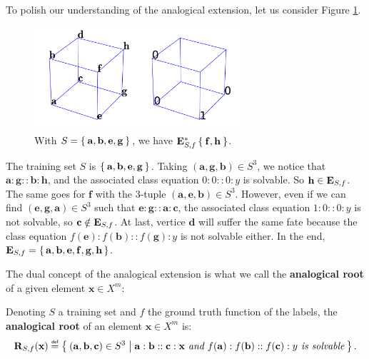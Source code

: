 To polish our understanding of the analogical extension, let us consider Figure
\ref{FIG:ae_example}.
\begin{figure}[!h]
\centering
  \includegraphics[width=3in]{figures/ae_example.pdf}
  \caption{With $S = \Set{\mathbf{a}, \mathbf{b}, \mathbf{e},
  \mathbf{g}}$, we have $\mathbf{E}_{S, f}^*\Set{\mathbf{f}, \mathbf{h}}$.}
\label{FIG:ae_example}
\end{figure}
The training set $S$ is $\Set{\mathbf{a}, \mathbf{b}, \mathbf{e},\mathbf{g}}$.
Taking $(\mathbf{a}, \mathbf{g}, \mathbf{b}) \in S^3$, we notice that
$\mathbf{a} : \mathbf{g} :: \mathbf{b} : \mathbf{h}$, and the associated class
equation $0:0::0:y$ is solvable. So $\mathbf{h} \in \mathbf{E}_{S,f}$. The same goes for
$\mathbf{f}$ with the 3-tuple $(\mathbf{a}, \mathbf{e}, \mathbf{b}) \in S^3$.
However, even if we can find $(\mathbf{e}, \mathbf{g}, \mathbf{a}) \in S^3$
such that $\mathbf{e} : \mathbf{g} :: \mathbf{a} : \mathbf{c}$, the associated
class equation $1:0::0:y$ is not solvable, so $\mathbf{c} \notin \mathbf{E}_{S,f}$. At
last, vertice $\mathbf{d}$ will suffer the same fate because the class equation
$f(\mathbf{e}) : f(\mathbf{b}) :: f(\mathbf{g}) : y$ is not solvable either. In
the end, $\mathbf{E}_{S,f} = \set{\mathbf{a}, \mathbf{b}, \mathbf{e}, \mathbf{f},
\mathbf{g}, \mathbf{h}}$.

The dual concept of the analogical extension is what we call the
\textbf{analogical root} of a given element $\mathbf{x} \in X^m$:

\begin{definition}
  \label{DEF:analogical_root}
  Denoting $S$ a training set and $f$ the ground truth function of the labels,
  the \textbf{analogical root} of an element $\mathbf{x} \in X^m$ is:
  $$
  \rsfx \eqdef \Set{(\mathbf{a}, \mathbf{b}, \mathbf{c}) \in S^3 |
  \mathbf{a}:\mathbf{b}::\mathbf{c}:\mathbf{x} \emph{ and }
  f(\mathbf{a}):f(\mathbf{b})::f(\mathbf{c}):y \emph{ is solvable}}.
  $$
\end{definition}


